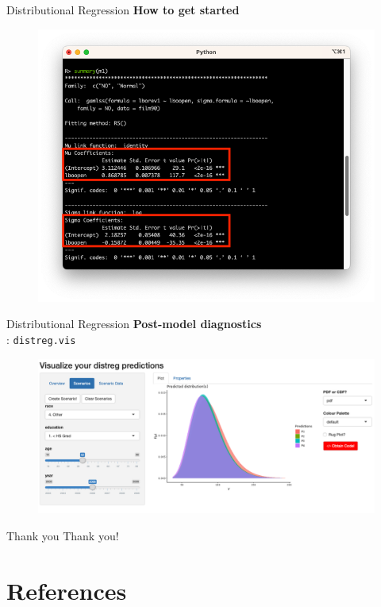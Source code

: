 \documentclass[t]{beamer} 	%
\begin{document}
\begin{frame}{Distributional Regression}
	\textbf{How to get started}
	\vspace{-0.3cm}
	\begin{figure}
		\includegraphics[width=\textwidth]{images/code_gamlss2.png}
	\end{figure}
\end{frame}

\begin{frame}{Distributional Regression}
	\textbf{Post-model diagnostics} \\
	\citet{stadlmann2022}: \texttt{distreg.vis}
	\begin{figure}
		\centering
		\includegraphics[width=\textwidth]{images/distreg.vis.png}
	\end{figure}
\end{frame}

\begin{frame}[c]{Thank you}
	\centering
	Thank you!
\end{frame}

\section*{References}

\AtBeginSection{}

\begin{frame}[allowframebreaks]
	
	
\end{frame}
\end{document}
